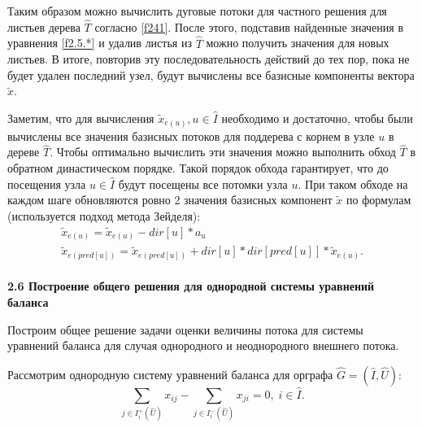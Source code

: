 \documentclass[14pt]{extarticle}%
\begin{document}
Таким образом можно вычислить дуговые потоки для частного решения для листьев дерева $\widehat{T}$ согласно \eqref{f241}. После этого, подставив найденные значения в уравнения \eqref{f2.5.*} и удалив листья из $\widehat{T}$ можно получить значения для новых листьев. В итоге, повторив эту последовательность действий до тех пор, пока не будет удален последний узел, будут вычислены все базисные компоненты вектора $\widetilde x$.

Заметим, что для вычисления $\widetilde{x}_{e(u)}, u\in \widehat{I}$ необходимо и достаточно, чтобы были вычислены все значения базисных потоков для поддерева с корнем в узле $u$ в дереве $\widehat{T}$. Чтобы оптимально вычислить эти значения можно выполнить обход $\widehat{T}$ в обратном династическом порядке. Такой порядок обхода гарантирует, что до посещения узла $u\in \widehat{I}$ будут посещены все потомки узла $u$. При таком обходе на каждом шаге обновляются ровно 2 значения базисных компонент $\widetilde x$ по формулам (используется подход метода Зейделя):
\begin{equation}\label{f242}
\begin{gathered}
\widetilde{x}_{e(u)}= \widetilde{x}_{e(u)}-dir[u]*a_u\\
\widetilde{x}_{e(pred[u])}=\widetilde{x}_{e(pred[u])} + dir[u]*dir[pred[u]]*\widetilde{x}_{e(u)}.
\end{gathered}
\end{equation}\\

\textbf{2.6 Построение общего решения для однородной системы уравнений баланса}

Построим общее решение задачи оценки величины потока для системы уравнений баланса для случая однородного и неоднородного внешнего потока.

Рассмотрим однородную систему уравнений баланса для орграфа $\widehat{G}=(\widehat{I},\widehat{U})$:
\begin{equation}\label{f2.6.1}
	\sum_{j\in I^+_i(\widehat{U})} x_{ij}-\sum_{j\in I^-_i(\widehat{U})}x_{ji}=0,\; i\in \widehat{I}.
\end{equation}
\end{document}
